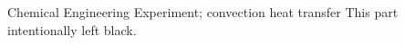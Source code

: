 \makecover

\begin{abstract}{化工原理实验; 对流传热}
这一部分有意留白。
\end{abstract}


\begin{abstractEng}{Chemical Engineering Experiment; convection heat transfer}
This part intentionally left black.
\end{abstractEng}


\tableofcontents